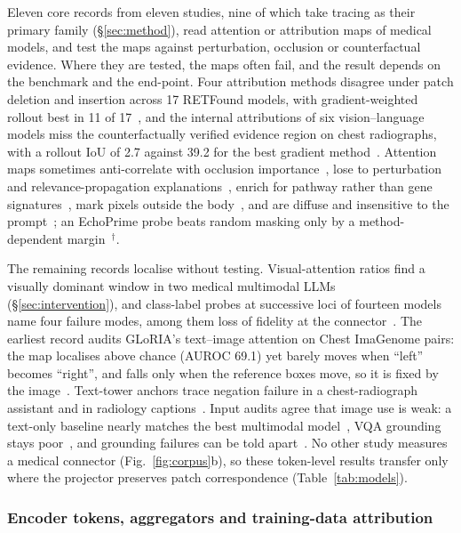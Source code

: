 Eleven core records from eleven studies, nine of which take tracing as their primary family
(\S\ref{sec:method}), read attention or attribution maps of medical models, and \Vtrany{} test the maps
against perturbation, occlusion or counterfactual evidence. Where they are tested, the maps often fail,
and the result depends on the benchmark and the end-point. Four attribution methods disagree under
patch deletion and insertion across 17 RETFound models, with gradient-weighted rollout best in 11 of
17~\cite{bors2026benchmarking}, and the internal attributions of six vision--language models miss the
counterfactually verified evidence region on chest radiographs, with a rollout IoU of 2.7 against 39.2
for the best gradient method~\cite{xiong2026rethinking}. Attention maps sometimes anti-correlate with
occlusion importance~\cite{sadanandan2026attention}, lose to perturbation and relevance-propagation
explanations~\cite{idaji2026beyond}, enrich for pathway rather than gene
signatures~\cite{srikanthan2026do}, mark pixels outside the body~\cite{hashmi2024towards}, and are
diffuse and insensitive to the prompt~\cite{injarabian2025interpreting}; an EchoPrime probe beats random
masking only by a method-dependent margin~\cite{akanova2026interpreting}$^{\dagger}$.

The remaining records localise without testing. Visual-attention ratios find a visually dominant window
in two medical multimodal LLMs~\cite{chen2026vihd} (\S\ref{sec:intervention}), and class-label probes at
successive loci of fourteen models name four failure modes, among them loss of fidelity at the
connector~\cite{zhu2026lost}. The earliest record audits GLoRIA's text--image attention on Chest
ImaGenome pairs: the map localises above chance (AUROC 69.1) yet barely moves when ``left'' becomes
``right'', and falls only when the reference boxes move, so it is fixed by the
image~\cite{mcinerney2022that}. Text-tower anchors trace negation failure in a chest-radiograph assistant
and in radiology captions~\cite{vu2025improving,abbasi2026layerspecific}. Input audits agree that image
use is weak: a text-only baseline nearly matches the best multimodal model~\cite{lotfinia2026vision},
VQA grounding stays poor~\cite{chen2026grounding}, and grounding failures can be told
apart~\cite{liu2026medical}. No other study measures a medical connector (Fig.~\ref{fig:corpus}b), so
these token-level results transfer only where the projector preserves patch correspondence
(Table~\ref{tab:models}).

\subsubsection{Encoder tokens, aggregators and training-data attribution}

